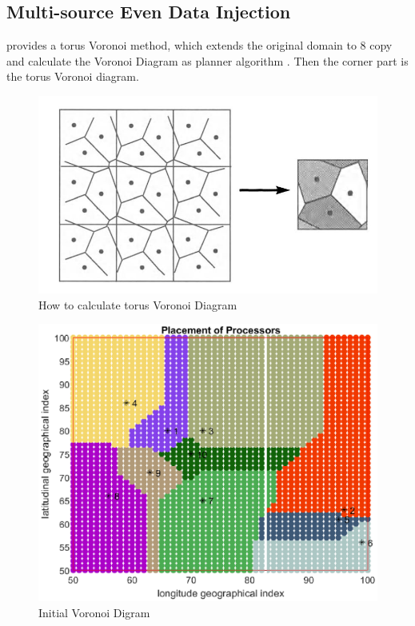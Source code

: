 \subsection{Multi-source Even Data Injection}
\newpage
{} \cite{grima2013computational} provides a torus Voronoi method, which extends the original domain to $8$ copy and calculate the Voronoi Diagram as planner algorithm \cite{fortune1987sweepline}.  Then the corner part is the torus Voronoi diagram.

\begin{figure}[!ht]
\centering
\includegraphics[width=1\columnwidth]{figure/how_voronoi.JPG}
\caption{How to calculate torus Voronoi Diagram}
\label{fig:how_voronoi}
\end{figure}

\begin{figure}[!ht]
\centering
\includegraphics[width=1\columnwidth]{figure/t_1.eps}
\caption{Initial Voronoi Digram}
\label{fig:t_1}
\end{figure}


